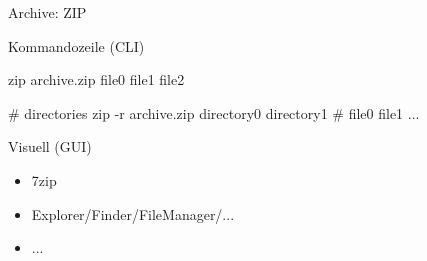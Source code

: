 \begin{frame}[fragile]{Archive: ZIP}\onslide<+->%
    \begin{block}{Kommandozeile (CLI)}
        \begin{plainbash}
zip archive.zip file0 file1 file2

# directories
zip -r archive.zip directory0 directory1 # file0 file1 ...
        \end{plainbash}
    \end{block}
    \begin{block}{Visuell (GUI)}
        \begin{itemize}
            \item 7zip
            \item Explorer/Finder/FileManager/...
            \item ...
        \end{itemize}
    \end{block}
\end{frame}